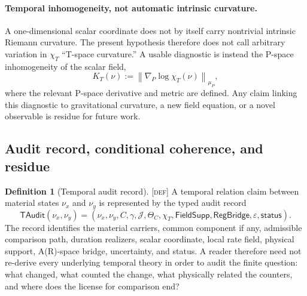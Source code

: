 \documentclass[11pt]{article}
\newcommand{\Defn}{\textsc{[def]}}
\theoremstyle{definition}
\newtheorem{sdefinition}{Definition}
\begin{document}
\paragraph{Temporal inhomogeneity, not automatic intrinsic curvature.}
A one-dimensional scalar coordinate does not by itself carry nontrivial intrinsic
Riemann curvature. The present hypothesis therefore does not call arbitrary
variation in $\chi_T$ ``T-space curvature.'' A usable diagnostic is instead the
P-space inhomogeneity of the scalar field,
\begin{equation}
K_T(\nu):=
\left\|\nabla_P\log\chi_T(\nu)\right\|_{\mu_P},
\label{eq:tspace-inhomogeneity}
\end{equation}
where the relevant P-space derivative and metric are defined. Any claim linking
this diagnostic to gravitational curvature, a new field equation, or a novel
observable is residue for future work.

\subsection{Audit record, conditional coherence, and residue}
\label{supp:tspace-audit}

\begin{sdefinition}[Temporal audit record]
\label{def:tspace-audit-record}
\Defn{} A temporal relation claim between material states $\nu_x$ and $\nu_y$ is
represented by the typed audit record
\begin{equation}
\mathsf{TAudit}(\nu_x,\nu_y)=
\left(
\nu_x,\nu_y,C,\gamma,\mathcal J,\Theta_C,\chi_T,
\mathsf{FieldSupp},\mathsf{RegBridge},\varepsilon,\mathsf{status}
\right).
\label{eq:tspace-audit-record}
\end{equation}
The record identifies the material carriers, common component if any, admissible
comparison path, duration realizers, scalar coordinate, local rate field, physical
support, A(R)-space bridge, uncertainty, and status. A reader therefore need not
re-derive every underlying temporal theory in order to audit the finite question:
what changed, what counted the change, what physically related the counters, and
where does the license for comparison end?
\end{sdefinition}
\end{document}
